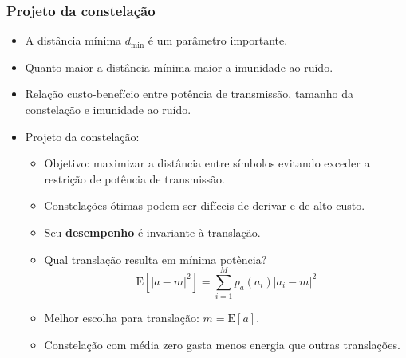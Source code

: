 \begin{frame}
	\frametitle{Projeto da constelação}

	\begin{itemize}
	    \item A distância mínima $d_{\text{min}}$ é um parâmetro importante.
	    \item Quanto maior a distância mínima maior a imunidade ao ruído.
	    \item Relação custo-benefício entre potência de transmissão, tamanho da constelação e imunidade ao ruído.
	    \item Projeto da constelação:
	    \begin{itemize}
	      \item Objetivo: maximizar a distância entre símbolos evitando exceder a restrição de potência de transmissão.
	      \item Constelações ótimas podem ser difíceis de derivar e de alto custo.
	      \item Seu \textbf{desempenho} é invariante à translação.
	      \item Qual translação resulta em mínima potência?
	      \begin{equation*}
		\mathrm{E}[|a-m|^2] = \sum_{i=1}^M p_a(a_i) |a_i-m|^2
	      \end{equation*}
	      \item Melhor escolha para translação: $m = \mathrm{E}[a]$.
	      \item Constelação com média zero gasta menos energia que outras translações.
	    \end{itemize}	    	    
	\end{itemize}	
\end{frame}

